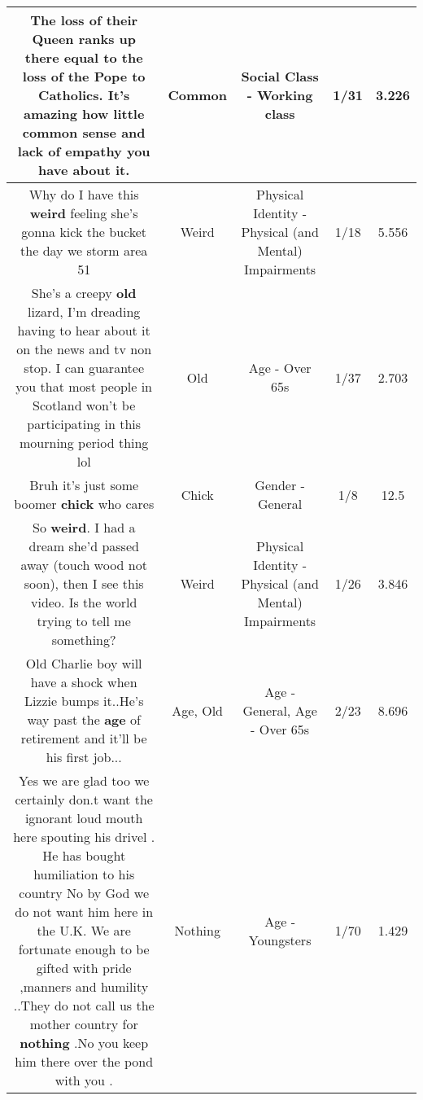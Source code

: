 \documentclass[11pt]{article}
\newlength\mylength
\begin{document}
\begin{center}
\begin{longtable}{|C{.65\mylength}|C{.30\mylength}|C{.12\mylength}|C{.12\mylength}|C{.12\mylength}|}
  \small The loss of their Queen ranks up there equal to the loss of the Pope to Catholics.  It's amazing how little \textbf{common} sense and lack of empathy you have about it.\normalsize   & Common & Social Class - Working class & 1/31 & 3.226 \\  \hline
  \small Why do I have this \textbf{weird} feeling she's gonna kick the bucket the day we storm area 51\normalsize   & Weird & Physical Identity - Physical (and Mental) Impairments & 1/18 & 5.556 \\  \hline
  \small She's a creepy \textbf{old} lizard, I'm dreading having to hear about it on the news and tv non stop.  I can guarantee you that most people in Scotland won't be participating in this mourning period thing lol\normalsize   & Old & Age - Over 65s & 1/37 & 2.703 \\  \hline
  \small Bruh it's just some boomer \textbf{chick} who cares\normalsize   & Chick & Gender - General & 1/8 & 12.5 \\  \hline
  \small So \textbf{weird}. I had a dream she'd passed away (touch wood not soon), then I see this video. Is the world trying to tell me something?\normalsize   & Weird & Physical Identity - Physical (and Mental) Impairments & 1/26 & 3.846 \\  \hline
  \small Old Charlie boy will have a shock when Lizzie bumps it..He's way past the \textbf{age} of retirement and it'll be his first job...\normalsize   & Age, Old & Age - General, Age - Over 65s & 2/23 & 8.696 \\  \hline
  \small Yes we are glad too we certainly don.t want the ignorant loud mouth here  spouting his drivel . He  has bought humiliation to his country  No by God we do not want him here in the U.K.  We are fortunate enough  to be gifted with pride ,manners and humility ..They do not call us the mother country for \textbf{nothing} .No you keep him there over the pond with you .\normalsize   & Nothing & Age - Youngsters & 1/70 & 1.429 \\  \hline

\end{longtable}
\end{center}
\end{document}
